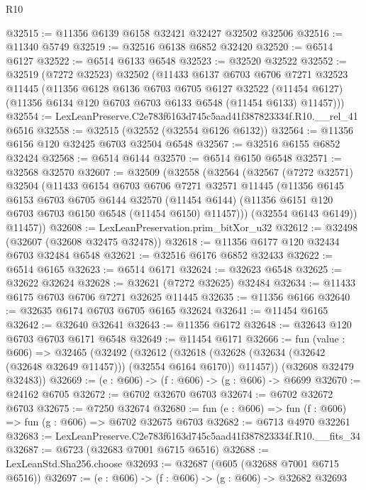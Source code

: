 \begin{lexlean}{R10}
\begin{coremodule}
@32515 := @11356 @6139 @6158 @32421 @32427 @32502 @32506
@32516 := @11340 @5749
@32519 := @32516 @6138 @6852 @32420
@32520 := @6514 @6127
@32522 := @6514 @6133 @6548
@32523 := @32520 @32522
@32552 := @32519
    (@7272 @32523)
    @32502
    (@11433
      @6137
      @6703
      @6706
      @7271
      @32523
      @11445
      (@11356
        @6128
        @6136
        @6703
        @6705
        @6127
        @32522
        (@11454 @6127)
        (@11356 @6134 @120 @6703 @6703 @6133 @6548 (@11454 @6133) @11457)))
@32554 := LexLeanPreserve.C2e783f6163d745c5aad41f387823334f.R10.__rel_41 @6516
@32558 := @32515 (@32552 (@32554 @6126 @6132))
@32564 := @11356 @6156 @120 @32425 @6703 @32504 @6548
@32567 := @32516 @6155 @6852 @32424
@32568 := @6514 @6144
@32570 := @6514 @6150 @6548
@32571 := @32568 @32570
@32607 := @32509
    (@32558
      (@32564
        (@32567
          (@7272 @32571)
          @32504
          (@11433
            @6154
            @6703
            @6706
            @7271
            @32571
            @11445
            (@11356
              @6145
              @6153
              @6703
              @6705
              @6144
              @32570
              (@11454 @6144)
              (@11356 @6151 @120 @6703 @6703 @6150 @6548 (@11454 @6150) @11457)))
          (@32554 @6143 @6149))
        @11457))
@32608 := LexLeanPreservation.prim_bitXor_u32
@32612 := @32498 (@32607 (@32608 @32475 @32478))
@32618 := @11356 @6177 @120 @32434 @6703 @32484 @6548
@32621 := @32516 @6176 @6852 @32433
@32622 := @6514 @6165
@32623 := @6514 @6171
@32624 := @32623 @6548
@32625 := @32622 @32624
@32628 := @32621 (@7272 @32625) @32484
@32634 := @11433 @6175 @6703 @6706 @7271 @32625 @11445
@32635 := @11356 @6166
@32640 := @32635 @6174 @6703 @6705 @6165 @32624
@32641 := @11454 @6165
@32642 := @32640 @32641
@32643 := @11356 @6172
@32648 := @32643 @120 @6703 @6703 @6171 @6548
@32649 := @11454 @6171
@32666 := fun (value : @606) =>
  @32465
    (@32492
      (@32612
        (@32618 (@32628 (@32634 (@32642 (@32648 @32649 @11457))) (@32554 @6164 @6170)) @11457))
      (@32608 @32479 @32483))
@32669 := (e : @606) -> (f : @606) -> (g : @606) -> @6699
@32670 := @24162 @6705
@32672 := @6702 @32670 @6703
@32674 := @6702 @32672 @6703
@32675 := @7250 @32674
@32680 := fun (e : @606) => fun (f : @606) => fun (g : @606) => @6702 @32675 @6703
@32682 := @6713 @4970 @32261
@32683 := LexLeanPreserve.C2e783f6163d745c5aad41f387823334f.R10.__fits_34
@32687 := @6723 (@32683 @7001 @6715 @6516)
@32688 := LexLeanStd.Sha256.choose
@32693 := @32687 (@605 (@32688 @7001 @6715 @6516))
@32697 := (e : @606) -> (f : @606) -> (g : @606) -> @32682 @32693

\end{coremodule}
\end{lexlean}
